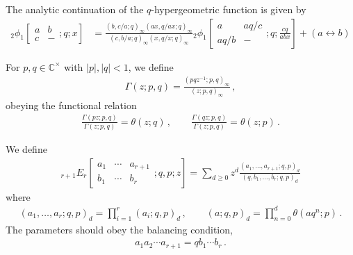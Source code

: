 \begin{proposition}
    The analytic continuation of the $q$-hypergeometric function is given by
    \begin{align}
        {_2\phi_1} \left[
    \begin{matrix}
        a & b \\ c & -
    \end{matrix}; q; x
    \right]
    & = 
    \frac{(b,c/a;q)_\infty (ax, q/ax;q)_\infty}{(c,b/a;q)_\infty (x, q/x;q)_\infty} {_2\phi_1} \left[
    \begin{matrix}
        a & aq/c \\ aq/b & -
    \end{matrix}; q; \frac{cq}{abx}
    \right]
    + (a \leftrightarrow b)
    \end{align}
\end{proposition}
\fi


\begin{definition}
For $p,q \in \mathbb{C}^\times$ with $|p|, |q| < 1$, we define
\begin{align}
    \Gamma(z;p,q) = \frac{(pqz^{-1};p,q)_\infty}{(z;p,q)_\infty} \, ,
    \label{eq:ell_gamma_fn}
\end{align}
obeying the functional relation
\begin{align}
    \frac{\Gamma(pz;p,q)}{\Gamma(z;p,q)} = \theta(z;q)
    \, , \qquad 
    \frac{\Gamma(qz;p,q)}{\Gamma(z;p,q)} = \theta(z;p)
    \, .
\end{align}    
\end{definition}



\begin{definition}\label{def:E-hypergeometric}
    We define 
    \begin{align}
        {_{r+1} E_r} 
        \left[
        \begin{matrix}
            a_1 & \cdots & a_{r+1} \\ b_1 & \cdots & b_r
        \end{matrix}
        ; q, p; z
        \right]
        = \sum_{d \ge 0} z^d \frac{(a_1,\ldots,a_{r+1};q,p)_d}{(q,b_1,\ldots,b_{r};q,p)_d}
    \end{align}
    where
    \begin{align}
        (a_1,\ldots,a_{r};q,p)_d = \prod_{i=1}^r (a_i;q,p)_d
        \, , \qquad 
        (a;q,p)_d = \prod_{n=0}^d \theta(a q^n; p)
        \, .
    \end{align}
    The parameters should obey the balancing condition,
    \begin{align}
        a_1 a_2 \cdots a_{r+1} = q b_1 \cdots b_r \, .
        \label{eq:balance_cond}
    \end{align}
\end{definition}






